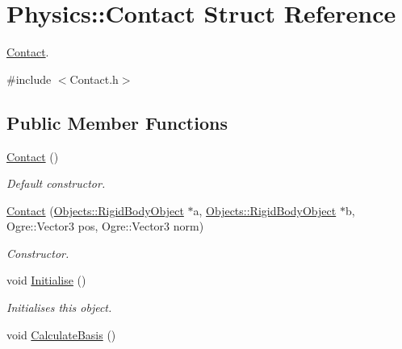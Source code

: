 \hypertarget{struct_physics_1_1_contact}{\section{Physics\-:\-:Contact Struct Reference}
\label{struct_physics_1_1_contact}
}


\hyperlink{struct_physics_1_1_contact}{Contact}.  




{\ttfamily \#include $<$Contact.\-h$>$}

\subsection*{Public Member Functions}
\begin{DoxyCompactItemize}
\item 
\hypertarget{struct_physics_1_1_contact_aee83d0ea1b8e3a92c2eed928a7167741}{\hyperlink{struct_physics_1_1_contact_aee83d0ea1b8e3a92c2eed928a7167741}{Contact} ()}\label{struct_physics_1_1_contact_aee83d0ea1b8e3a92c2eed928a7167741}

\begin{DoxyCompactList}\small\item\em Default constructor. \end{DoxyCompactList}\item 
\hyperlink{struct_physics_1_1_contact_afcf8dcb2b09f4c4d378fb1c3c9285cfc}{Contact} (\hyperlink{class_objects_1_1_rigid_body_object}{Objects\-::\-Rigid\-Body\-Object} $\ast$a, \hyperlink{class_objects_1_1_rigid_body_object}{Objects\-::\-Rigid\-Body\-Object} $\ast$b, Ogre\-::\-Vector3 pos, Ogre\-::\-Vector3 norm)
\begin{DoxyCompactList}\small\item\em Constructor. \end{DoxyCompactList}\item 
\hypertarget{struct_physics_1_1_contact_a32fe5d698dde1965c95ea280dcd0125a}{void \hyperlink{struct_physics_1_1_contact_a32fe5d698dde1965c95ea280dcd0125a}{Initialise} ()}\label{struct_physics_1_1_contact_a32fe5d698dde1965c95ea280dcd0125a}

\begin{DoxyCompactList}\small\item\em Initialises this object. \end{DoxyCompactList}\item 
\hypertarget{struct_physics_1_1_contact_a9882ba374b50f2c1865d843520f38f71}{void \hyperlink{struct_physics_1_1_contact_a9882ba374b50f2c1865d843520f38f71}{Calculate\-Basis} ()}\label{struct_physics_1_1_contact_a9882ba374b50f2c1865d843520f38f71}


\end{DoxyCompactItemize}
